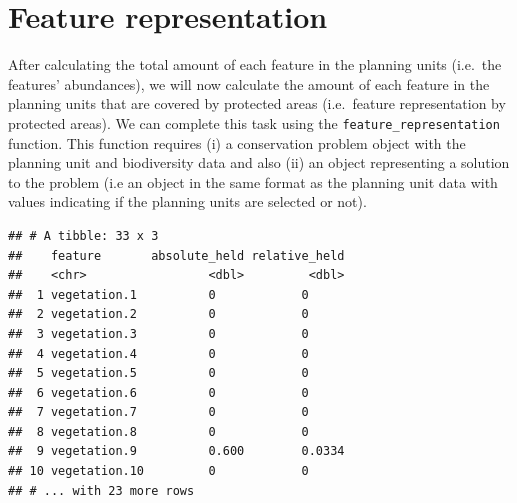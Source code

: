 \documentclass[12pt,]{book}
\newenvironment{Shaded}{\begin{snugshade}}{\end{snugshade}}
\newcommand{\KeywordTok}[1]{\textcolor[rgb]{0.13,0.29,0.53}{\textbf{#1}}}
\newcommand{\StringTok}[1]{\textcolor[rgb]{0.31,0.60,0.02}{#1}}
\newcommand{\CommentTok}[1]{\textcolor[rgb]{0.56,0.35,0.01}{\textit{#1}}}
\newcommand{\OperatorTok}[1]{\textcolor[rgb]{0.81,0.36,0.00}{\textbf{#1}}}
\newcommand{\NormalTok}[1]{#1}
\begin{document}
\section{Feature representation}\label{feature-representation}

After calculating the total amount of each feature in the planning units
(i.e.~the features' abundances), we will now calculate the amount of
each feature in the planning units that are covered by protected areas
(i.e.~feature representation by protected areas). We can complete this
task using the \texttt{feature\_representation} function. This function
requires (i) a conservation problem object with the planning unit and
biodiversity data and also (ii) an object representing a solution to the
problem (i.e an object in the same format as the planning unit data with
values indicating if the planning units are selected or not).

\begin{Shaded}
\end{Shaded}

\begin{verbatim}
## # A tibble: 33 x 3
##    feature       absolute_held relative_held
##    <chr>                 <dbl>         <dbl>
##  1 vegetation.1          0            0     
##  2 vegetation.2          0            0     
##  3 vegetation.3          0            0     
##  4 vegetation.4          0            0     
##  5 vegetation.5          0            0     
##  6 vegetation.6          0            0     
##  7 vegetation.7          0            0     
##  8 vegetation.8          0            0     
##  9 vegetation.9          0.600        0.0334
## 10 vegetation.10         0            0     
## # ... with 23 more rows
\end{verbatim}
\end{document}
